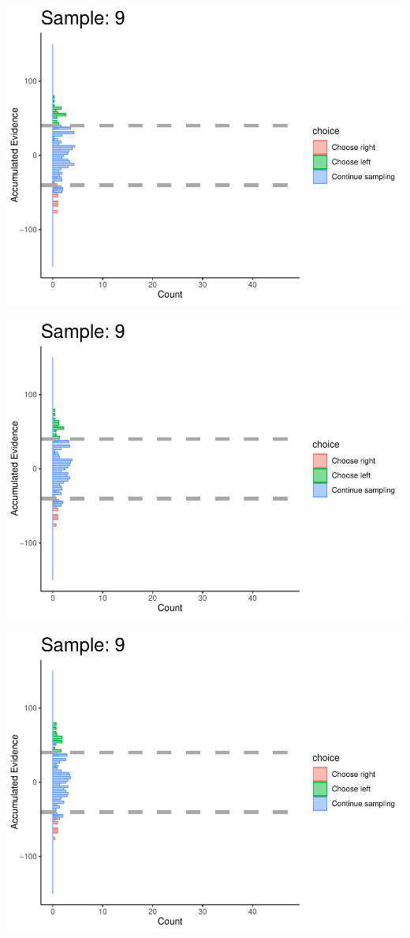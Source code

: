 \documentclass[
]{book}
\begin{document}
\begin{center}\includegraphics[width=0.8\linewidth]{LateNightBayes_files/figure-latex/collapsing_check-86} \end{center}

\begin{center}\includegraphics[width=0.8\linewidth]{LateNightBayes_files/figure-latex/collapsing_check-87} \end{center}

\begin{center}\includegraphics[width=0.8\linewidth]{LateNightBayes_files/figure-latex/collapsing_check-88} \end{center}
\end{document}
